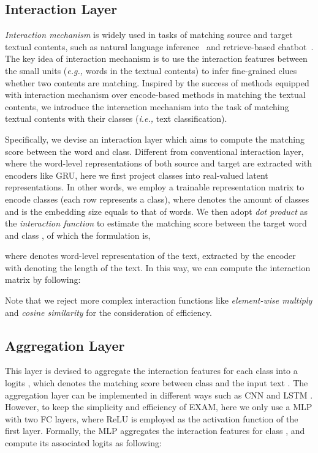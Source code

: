 \documentclass[letterpaper]{article} \usepackage{aaai19}  \usepackage{times}  \usepackage{helvet}  \usepackage{courier}  \usepackage{url}  \usepackage{graphicx}
\newcommand{\ie}{\emph{i.e., }}
\newcommand{\eg}{\emph{e.g., }}
\begin{document}
\subsection{Interaction Layer}
\textit{Interaction mechanism} is widely used in tasks of matching source and target textual contents, such as natural language inference~\cite{llstm} and retrieve-based chatbot~\cite{smn}. The key idea of interaction mechanism is to use the interaction features between the small units (\eg words in the textual contents) to infer fine-grained clues whether two contents are matching. Inspired by the success of methods equipped with interaction mechanism over encode-based methods in matching the textual contents, we introduce the interaction mechanism into the task of matching textual contents with their classes (\ie text classification). 

Specifically, we devise an interaction layer which aims to compute the matching score between the word and class. Different from conventional interaction layer, where the word-level representations of both source and target are extracted with encoders like GRU, here we first project classes into real-valued latent representations. In other words, we employ a trainable representation matrix  to encode classes (each row represents a class), where  denotes the amount of classes and  is the embedding size equals to that of words. 
We then adopt \textit{dot product} as the \textit{interaction function} to estimate the matching score between the target word  and class , of which the formulation is,

where  denotes word-level representation of the text, extracted by the encoder with  denoting the length of the text. 
In this way, we can compute the interaction matrix  by following:

Note that we reject more complex interaction functions like \textit{element-wise multiply} \cite{diin} and \textit{cosine similarity} \cite{BIMPM} for the consideration of efficiency.

\subsection{Aggregation Layer}
This layer is devised to aggregate the interaction features for each class  into a logits , which denotes the matching score between class  and the input text . The aggregation layer can be implemented in different ways such as CNN \cite{diin} and LSTM \cite{BIMPM}. However, to keep the simplicity and efficiency of EXAM, here we only use a MLP with two FC layers, where ReLU is employed as the activation function of the first layer. Formally, the MLP aggregates the interaction features  for class , and compute its associated logits as following:
\end{document}
